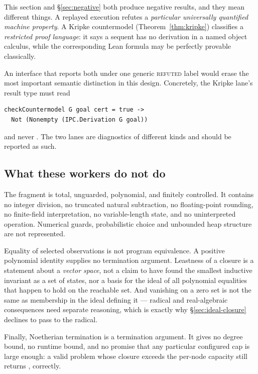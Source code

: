 \begin{remark}
\label{rem:two-lanes}
This section and \S\ref{sec:negative} both produce negative results, and they
mean different things. A replayed execution refutes a \emph{particular
universally quantified machine property}. A Kripke countermodel
(Theorem~\ref{thm:kripke}) classifies a \emph{restricted proof language}: it
says a sequent has no derivation in a named object calculus, while the
corresponding Lean formula may be perfectly provable classically.

An interface that reports both under one generic \textsc{refuted} label would
erase the most important semantic distinction in this design. Concretely, the
Kripke lane's result type must read
\begin{lstlisting}
checkCountermodel G goal cert = true ->
  Not (Nonempty (IPC.Derivation G goal))
\end{lstlisting}
and never . The two lanes are diagnostics of different
kinds and should be reported as such.
\end{remark}

\subsection{What these workers do not do}

The fragment is total, unguarded, polynomial, and finitely controlled. It
contains no integer division, no truncated natural subtraction, no
floating-point rounding, no finite-field interpretation, no variable-length
state, and no uninterpreted operation. Numerical guards, probabilistic choice
and unbounded heap structure are not represented.

Equality of selected observations is not program equivalence. A positive
polynomial identity supplies no termination argument. Leastness of a closure is
a statement about a \emph{vector space}, not a claim to have found the smallest
inductive invariant as a set of states, nor a basis for the ideal of all
polynomial equalities that happen to hold on the reachable set. And vanishing on
a zero set is not the same as membership in the ideal defining it --- radical
and real-algebraic consequences need separate reasoning, which is exactly why
\S\ref{sec:ideal-closure} declines to pass to the radical.

Finally, Noetherian termination is a termination argument. It gives no degree
bound, no runtime bound, and no promise that any particular configured cap is
large enough: a valid problem whose closure exceeds the per-node capacity still
returns \unknown{}, correctly.
